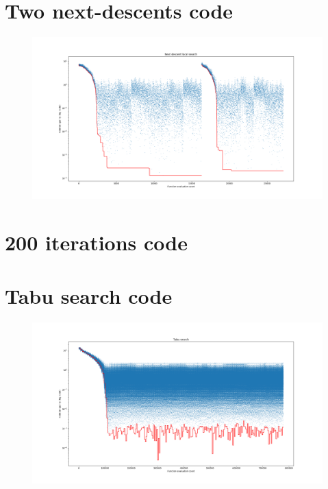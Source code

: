 \documentclass[10pt,a4paper]{article}
\begin{document}
\newpage
\section*{Two next-descents code}

\newpage
\begin{figure}[H]
	\centering
	\includegraphics[width=1.8\linewidth, angle=90, origin=c]{2_descent}
\end{figure}


\newpage
\section*{200 iterations code}


\newpage
\section*{Tabu search code}

\begin{figure}[H]
	\centering
	\includegraphics[width=1.8\linewidth, angle=90, origin=c]{tabu_search}
\end{figure}
\end{document}
